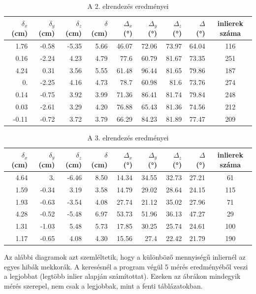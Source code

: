 \begin{table}[H]
\centering
\begin{tabular}{|rrr|r|rrr|r|c|}
\hline 
$\delta_x$ (cm) & $\delta_y$ (cm) & $\delta_z$ (cm) & $\delta$ (cm) & $\Delta_x$ (°) & $\Delta_y$ (°) & $\Delta_z$ (°) & $\Delta$ (°) & inlierek száma \\ \hline
1.76&	-0.58&	-5.35&	5.66&	46.07&	72.06&	73.97&	64.04&	116\\
0.16&	-2.24&	4.23&	4.79&	77.6&	60.79&	81.67&	73.35&	251\\
4.24&	0.31&	3.56&	5.55&	61.48&	96.44&	81.65&	79.86&	187\\
0.&	-2.25&	4.16&	4.73&	78.7&	60.98&	81.6&	73.76&	274\\
0.14&	-0.75&	3.92&	3.99&	71.36&	86.41&	81.74&	79.84&	248\\
0.03&	-2.61&	3.29&	4.20&	76.88&	65.43&	81.36&	74.56&	212\\
-0.11&	-0.72&	3.72&	3.79&	66.29&	84.23&	81.89&	77.47&	209\\
\hline
\end{tabular}
\caption{A 2. elrendezés eredményei}
\end{table}

\begin{table}[H]
\centering
\begin{tabular}{|rrr|r|rrr|r|c|}
\hline 
$\delta_x$ (cm) & $\delta_y$ (cm) & $\delta_z$ (cm) & $\delta$ (cm) & $\Delta_x$ (°) & $\Delta_y$ (°) & $\Delta_z$ (°) & $\Delta$ (°) & inlierek száma \\ \hline
4.64&	3.&	-6.46&	8.50&	14.34&	34.55&	32.73&	27.21&	61\\
1.59&	-0.34&	3.19&	3.58&	14.79&	29.02&	28.64&	24.15&	115\\
1.93&	-0.63&	-3.54&	4.08&	27.74&	21.12&	35.02&	27.96&	71\\
4.28&	-0.52&	-5.48&	6.97&	53.73&	51.96&	36.13&	47.27&	29\\
1.31&	-1.03&	5.48&	5.73&	17.85&	30.25&	25.74&	24.61&	100\\
1.17&	-0.65&	4.08&	4.30&	15.56&	27.4&	22.42&	21.79&	190\\
\hline
\end{tabular}
\caption{A 3. elrendezés eredményei}
\end{table}

Az alábbi diagramok azt szemléltetik, hogy a különböző mennyiségű inliernél az egyes hibák mekkorák. A keresésnél a program végül 5 mérés eredményéből veszi a legjobbat (legtöbb inlier alapján számítottat). Ezeken az ábrákon mindegyik mérés szerepel, nem csak a legjobbak, mint a fenti táblázatokban.

